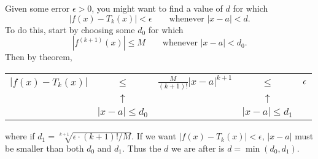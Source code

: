 Given some error $\epsilon>0$, you might want to find a value of $d$ for which 
$$|f(x)-T_k(x)|<\epsilon\quad\quad\text{whenever } |x-a|<d.$$
To do this, start by choosing some $d_0$ for which 
$$\left|f^{(k+1)}(x)\right| \leq M\quad\quad\text{whenever } |x-a|<d_0.$$
Then by theorem,
\begin{center}
\begin{tabular}{ccccc}
$|f(x)-T_k(x)|$ & $\leq$               & $\displaystyle\frac{M}{(k+1)!}|x-a|^{k+1}$  & $\leq$         & $\epsilon$ \\
                       & $\uparrow$       &                         					    & $\uparrow$ & \\
                       & $|x-a|\leq d_0$ &     							            & $|x-a|\leq d_1$ \\
\end{tabular}
\end{center}
where if $d_1=\sqrt[k+1]{\epsilon\cdot (k+1)!/M}$.  If we want $|f(x)-T_k(x)|<\epsilon$, $|x-a|$ must be smaller than both $d_0$ and $d_1$. Thus the $d$ we are after is $d=\min\left(d_0, d_1\right)$.

















